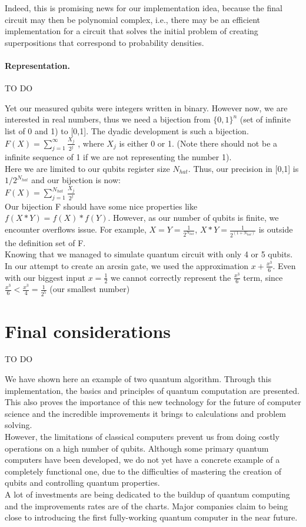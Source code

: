 \documentclass[a4paper, 10pt]{article}
\numberwithin{equation}{section}
\numberwithin{figure}{section}
\numberwithin{table}{section}
\begin{document}
Indeed, this is promising news for our implementation idea, because the final circuit may then be polynomial complex, i.e., there may be an efficient implementation for a circuit that solves the initial problem of creating superpositions that correspond to probability densities.

\paragraph{Representation.}
{\color{red} TO DO}

Yet our measured qubits were integers written in binary. However now, we are interested in real numbers, thus we need a bijection from $\{0,1\}^{n}$ (set of infinite list of 0 and 1) to [0,1]. The dyadic development is such a bijection.\\
$F(X)=\sum_{j=1}^\infty \frac{X_j}{2^j}$ , where $X_j$ is either 0 or 1. (Note there should not be a infinite sequence of 1 if we are not representing the number 1).\\
Here we are limited to our qubits register size $N_{hat}$. Thus, our precision in [0,1] is $1/2^{N_{hat}}$ and our bijection is now:\\
$F(X) =\sum_{j=1}^{N_{hat}} \frac{X_j}{2^j}$\\
Our bijection F should have some nice properties like $f(X*Y) = f(X)*f(Y)$. However, as our number of qubits is finite, we encounter overflows issue. For example, $X = Y = \frac{1}{2^{N_{hat}}}$, $X*Y = \frac{1}{2^{(1+ N_{hat})}}$ is outside the definition set of F.\\
Knowing that we managed to simulate quantum circuit with only 4 or 5 qubits. In our attempt to create an arcsin gate, we used the approximation $x + \frac{x^{3}}{6}$. Even with our biggest input $x = \frac{1}{2}$ we cannot correctly represent the $\frac{x^{3}}{6}$ term, since $\frac{x^{3}}{6}< \frac{x^{3}}{4} = \frac{1}{2^5}$ (our smallest number)

\clearpage
\newpage
\section{Final considerations}
{\color{red} TO DO}

We have shown here an example of two quantum algorithm. Through this implementation, the basics and principles of quantum computation are presented. This also proves the importance of this new technology for the future of computer science and the incredible improvements it brings to calculations and problem solving.\\
However, the limitations of classical computers prevent us from doing costly operations on a high number of qubits. Although some primary quantum computers have been developed, we do not yet have a concrete example of a completely functional one, due to the difficulties of mastering the creation of qubits and controlling quantum properties.\\
A lot of investments are being dedicated to the buildup of quantum computing and the improvements rates are of the charts. Major companies claim to being close to introducing the first fully-working quantum computer in the near future.\\
\end{document}
